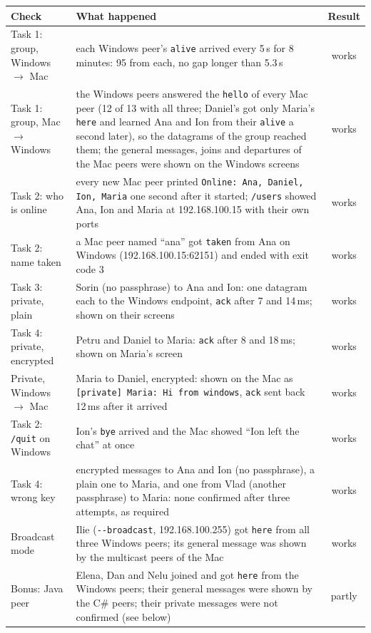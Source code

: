 \documentclass[11pt,a4paper]{article}
\newcommand{\code}[1]{{\frenchspacing\texttt{#1}}}
\begin{document}
\begin{center}
\small
\begin{tabularx}{\linewidth}{@{}p{3.6cm}Xc@{}}
\toprule
Check & What happened & Result \\
\midrule
Task 1: group, Windows $\to$ Mac & each Windows peer's \code{alive} arrived every 5\,s for 8 minutes:
  95 from each, no gap longer than 5.3\,s & works \\
Task 1: group, Mac $\to$ Windows & the Windows peers answered the \code{hello} of every Mac peer (12 of 13 with all
  three; Daniel's got only Maria's \code{here} and learned Ana and Ion from their \code{alive} a
  second later), so the datagrams of the group reached them; the general messages, joins and departures of the
  Mac peers were shown on the Windows screens & works \\
Task 2: who is online & every new Mac peer printed \code{Online: Ana, Daniel, Ion, Maria} one second
  after it started; \code{/users} showed Ana, Ion and Maria at 192.168.100.15 with their own ports & works \\
Task 2: name taken & a Mac peer named ``ana'' got \code{taken} from Ana on Windows
  (192.168.100.15:62151) and ended with exit code 3 & works \\
Task 3: private, plain & Sorin (no passphrase) to Ana and Ion: one datagram each to the Windows
  endpoint, \code{ack} after 7 and 14\,ms; shown on their screens & works \\
Task 4: private, encrypted & Petru and Daniel to Maria: \code{ack} after 8 and 18\,ms; shown on Maria's screen & works \\
Private, Windows $\to$ Mac & Maria to Daniel, encrypted: shown on the Mac as
  \code{[private] Maria: Hi from windows}, \code{ack} sent back 12\,ms after it arrived & works \\
Task 2: \code{/quit} on Windows & Ion's \code{bye} arrived and the Mac showed ``Ion left the chat'' at
  once & works \\
Task 4: wrong key & encrypted messages to Ana and Ion (no passphrase), a plain one to Maria, and one
  from Vlad (another passphrase) to Maria: none confirmed after three attempts, as required & works \\
Broadcast mode & Ilie (\code{-{}-broadcast}, 192.168.100.255) got \code{here} from all three
  Windows peers; its general message was shown by the multicast peers of the Mac & works \\
Bonus: Java peer & Elena, Dan and Nelu joined and got \code{here} from the Windows peers; their general
  messages were shown by the C\# peers; their private messages were not confirmed (see below) & partly \\
\bottomrule
\end{tabularx}
\end{center}
\end{document}
